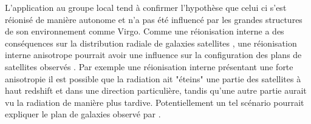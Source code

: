 L'application au groupe local tend à confirmer l'hypothèse que celui ci s'est réionisé de manière autonome et n'a pas été influencé par les grandes structures de son environnement comme Virgo.
Comme une réionisation interne a des conséquences sur la distribution radiale de galaxies satellites \citep{2011MNRAS.417L..93O}, une réionisation interne anisotrope pourrait avoir une influence sur la configuration des plans de satellites observés \citep{2015ApJ...800...34G}.
Par exemple une réionisation interne présentant une forte anisotropie il est possible que la radiation ait "éteins" une partie des satellites à haut redshift et dans une direction particulière, tandis qu'une autre partie aurait vu la radiation de manière plus tardive.
Potentiellement un tel scénario pourrait expliquer le plan de galaxies observé par \cite{2014Natur.511..563I}.